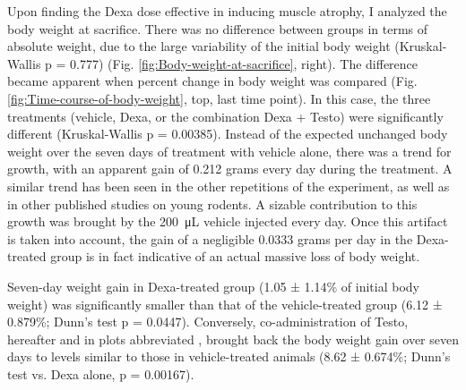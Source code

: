 \documentclass[12pt,english]{report}\usepackage[]{graphicx}\usepackage[]{color}
\begin{document}
Upon finding the Dexa dose effective in inducing muscle atrophy, I
analyzed the body weight at sacrifice. There was no difference between
groups in terms of absolute weight, due to the large variability of
the initial body weight (Kruskal-Wallis p = 0.777)
(Fig. \ref{fig:Body-weight-at-sacrifice}, right). The difference
became apparent when percent change in body weight was compared (Fig.
\ref{fig:Time-course-of-body-weight}, top, last time point). In this
case, the three treatments (vehicle, Dexa, or the combination Dexa
+ Testo) were significantly different (Kruskal-Wallis p = 0.00385).
Instead of the expected unchanged body weight over the seven days
of treatment with vehicle alone, there was a trend for growth, with
an apparent gain of 0.212
grams every day during the treatment. A similar trend has been seen
in the other repetitions of the experiment, as well as in other published
studies on young rodents. A sizable contribution to this growth was
brought by the \SI{200}{\micro\liter} vehicle injected every day.
Once this artifact is taken into account, the gain of a negligible
0.0333
grams per day in the Dexa-treated group is in fact indicative of an
actual massive loss of body weight.

Seven-day weight gain in Dexa-treated group (1.05
± 1.14\%
of initial body weight) was significantly smaller than that of the
vehicle-treated group (6.12
± 0.879\%;
Dunn's test p = 0.0447).
Conversely, co-administration of Testo, hereafter and in plots abbreviated
, brought back
the body weight gain over seven days to levels similar to those in
vehicle-treated animals (8.62
± 0.674\%;
Dunn's test vs. Dexa alone, p = 0.00167).
\end{document}
